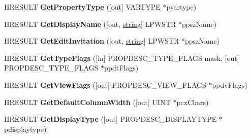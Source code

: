 \begin{DoxyCompactItemize}
\mbox{\label{interface_i_property_description_a17e904f901728aa619af5cb35e8c46c0}} 
H\+R\+E\+S\+U\+LT {\bfseries Get\+Property\+Type} (\mbox{[}out\mbox{]} V\+A\+R\+T\+Y\+PE $\ast$pvartype)
\item 
\mbox{\label{interface_i_property_description_a7a81fceb28375ba7dd450674622f97f9}} 
H\+R\+E\+S\+U\+LT {\bfseries Get\+Display\+Name} (\mbox{[}out, \hyperlink{structstring}{string}\mbox{]} L\+P\+W\+S\+TR $\ast$ppsz\+Name)
\item 
\mbox{\label{interface_i_property_description_a99e13abb4a110d8600f15ab308ca26f1}} 
H\+R\+E\+S\+U\+LT {\bfseries Get\+Edit\+Invitation} (\mbox{[}out, \hyperlink{structstring}{string}\mbox{]} L\+P\+W\+S\+TR $\ast$ppsz\+Name)
\item 
\mbox{\label{interface_i_property_description_a25ed6542a6b0a51a6c6c828c68ff5bbb}} 
H\+R\+E\+S\+U\+LT {\bfseries Get\+Type\+Flags} (\mbox{[}in\mbox{]} P\+R\+O\+P\+D\+E\+S\+C\+\_\+\+T\+Y\+P\+E\+\_\+\+F\+L\+A\+GS mask, \mbox{[}out\mbox{]} P\+R\+O\+P\+D\+E\+S\+C\+\_\+\+T\+Y\+P\+E\+\_\+\+F\+L\+A\+GS $\ast$ppdt\+Flags)
\item 
\mbox{\label{interface_i_property_description_ac6ddf14b127658ff19159504465c8a30}} 
H\+R\+E\+S\+U\+LT {\bfseries Get\+View\+Flags} (\mbox{[}out\mbox{]} P\+R\+O\+P\+D\+E\+S\+C\+\_\+\+V\+I\+E\+W\+\_\+\+F\+L\+A\+GS $\ast$ppdv\+Flags)
\item 
\mbox{\label{interface_i_property_description_a29a3c7af1b34a3d2d640787c59ccb5f6}} 
H\+R\+E\+S\+U\+LT {\bfseries Get\+Default\+Column\+Width} (\mbox{[}out\mbox{]} U\+I\+NT $\ast$pcx\+Chars)
\item 
\mbox{\label{interface_i_property_description_a81a73967e1d791b822dadd4da9256ea2}} 
H\+R\+E\+S\+U\+LT {\bfseries Get\+Display\+Type} (\mbox{[}out\mbox{]} P\+R\+O\+P\+D\+E\+S\+C\+\_\+\+D\+I\+S\+P\+L\+A\+Y\+T\+Y\+PE $\ast$pdisplaytype)
\item 
\mbox{\label{interface_i_property_description_ad8b071388ec584980e8ee35a1fb2dd1c}} 

\end{DoxyCompactItemize}
